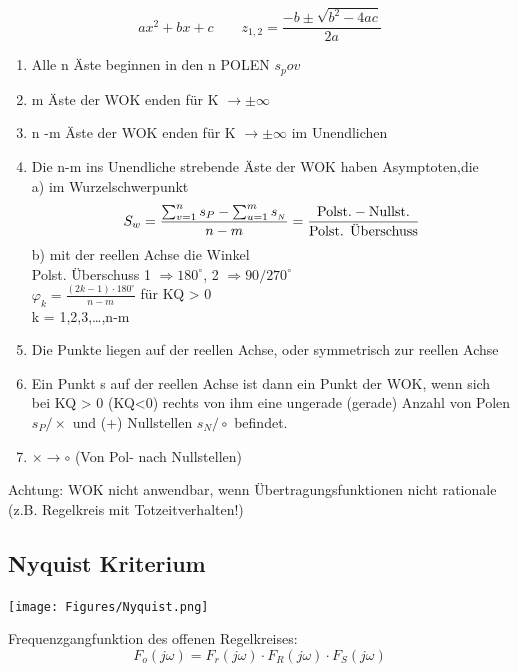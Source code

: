 \[ ax^2+bx+c \qquad z_{1,2} = \dfrac{-b \pm \sqrt{b^2 -4ac}}{2a}\]

\begin{mdframed}[style=exercise]
	\begin{enumerate}[leftmargin=*]
		\item Alle n Äste beginnen in den n POLEN $s_pov$
		\item m Äste der WOK enden für K $\rightarrow \pm \infty$
		\item n -m Äste der WOK enden für K $\rightarrow \pm \infty$ im Unendlichen
		\item Die n-m ins Unendliche strebende Äste der WOK haben Asymptoten,die\\
		      a) im Wurzelschwerpunkt
		      \[S_{w}=\frac{\sum_{v=1}^{n} s_{P}-\sum_{u=1}^{m} s_{_{N}}}{n-m} 
                        = \dfrac{\textnormal{Polst.}- \textnormal{Nullst.}}{\textnormal{Polst. Überschuss}}\]
		      b) mit der reellen Achse die Winkel\\
			  Polst. Überschuss 1 $\Rightarrow 180^{\circ}$, 2 $\Rightarrow 90/270^{\circ}$\\
		      $\varphi_{k}=\frac{(2 k-1) \cdot 180^{\circ}}{n-m}$ für KQ > 0\\
		      k = 1,2,3,\dots,n-m
		\item Die Punkte liegen auf der reellen Achse, oder symmetrisch zur reellen Achse
		\item Ein Punkt s auf der reellen Achse ist dann ein Punkt der WOK, wenn sich bei KQ > 0 (KQ<0)
		      rechts von ihm eine ungerade (gerade) Anzahl von Polen $s_{P} / \times$ und (+) Nullstellen $s_{N} / \circ$ befindet.
		\item $\times \rightarrow \circ $ (Von Pol- nach Nullstellen)
	\end{enumerate}

	Achtung: WOK nicht anwendbar, wenn Übertragungsfunktionen nicht rationale (z.B. Regelkreis mit Totzeitverhalten!)
\end{mdframed}



\subsection{Nyquist Kriterium}
\begin{center}
	\texttt{[image: Figures/Nyquist.png]}
\end{center}
Frequenzgangfunktion des offenen Regelkreises:
\[
	F_o (j\omega) = F_r (j\omega) \cdot F_R (j\omega) \cdot F_S (j\omega)
\]

